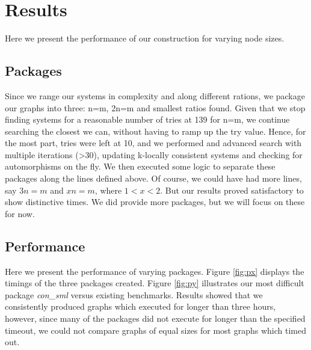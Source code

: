 \section{Results}
Here we present the performance of our construction for varying node sizes. 

\subsection{Packages}
Since we range our systems in complexity and along different rations, we package our graphs into three: n=m, 2n=m and smallest ratios found. Given that we stop finding systems for a reasonable number of tries at 139 for n=m, we continue searching the closest we can, without having to ramp up the try value. Hence, for the most part, tries were left at 10, and we performed and advanced search with multiple iterations (>30), updating k-locally consistent systems and checking for automorphisms on the fly. We then executed some logic to separate these packages along the lines defined above. Of course, we could have had more lines, say $3n=m$ and $xn=m$, where $1<x<2$. But our results proved satisfactory to show distinctive times. We did provide more packages, but we will focus on these for now.

\subsection{Performance}
Here we present the performance of varying packages. Figure \ref{fig:px} displays the timings of the three packages created. Figure \ref{fig:py} illustrates our most difficult package \emph{con\_sml} versus existing benchmarks. Results showed that we consistently produced graphs which executed for longer than three hours, however, since many of the packages did not execute for longer than the specified timeout, we could not compare graphs of equal sizes for most graphs which timed out. 

